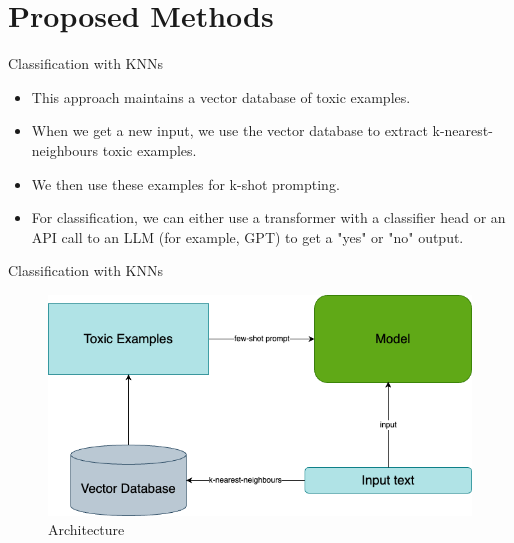 \section{Proposed Methods}






\begin{frame}{Classification with KNNs}

  \begin{itemize}
    \item This approach maintains a vector database of toxic examples.
    \item When we get a new input, we use the vector database to extract k-nearest-neighbours toxic examples.
    \item We then use these examples for k-shot prompting.
    \item For classification, we can either use a transformer with a classifier head or an API call to an LLM (for example, GPT) to get a "yes" or "no" output.
  \end{itemize}
    
\end{frame}


\begin{frame}{Classification with KNNs}

  \begin{figure}
    \centering
    \includegraphics[width=0.8\linewidth]{images/architecture.png}
    \caption{Architecture}
  \end{figure}

\end{frame}
